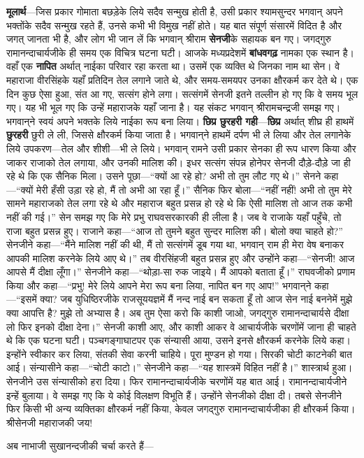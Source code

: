\begin{sloppypar}\justifying{}
\textbf{मूलार्थ}—जिस प्रकार गोमाता बछड़ेके लिये सदैव सन्मुख होती है, उसी प्रकार श्याम\-सुन्दर भगवान् अपने भक्तोंके सदैव सन्मुख रहते हैं, उनसे कभी भी विमुख नहीं होते। यह बात संपूर्ण संसारमें विदित है और जगत् जानता भी है, और लोग भी जान लें कि भगवान् श्रीराम \textbf{सेनजी}के सहायक बन गए। जगद्गुरु रामानन्दाचार्यजीके ही समय एक विचित्र घटना घटी। आजके मध्यप्रदेशमें \textbf{बांधवगढ़} नामका एक स्थान है। वहाँ एक \textbf{नापित} अर्थात् नाईका परिवार रहा करता था। उसमें एक व्यक्ति थे जिनका नाम था सेन। वे महाराजा वीरसिंहके यहाँ प्रतिदिन तेल लगाने जाते थे, और समय-समयपर उनका क्षौरकर्म कर देते थे। एक दिन कुछ ऐसा हुआ, संत आ गए, सत्संग होने लगा। सत्संगमें सेनजी इतने तल्लीन हो गए कि वे समय भूल गए। यह भी भूल गए कि उन्हें महाराजके यहाँ जाना है। यह संकट भगवान् श्रीरामचन्द्रजी समझ गए। भगवान्‌ने स्वयं अपने भक्तके लिये नाईका रूप बना लिया। \textbf{छिप्र छुरहरी गही}—\textbf{छिप्र} अर्थात् शीघ्र ही हाथमें \textbf{छुरहरी} छुरी ले ली, जिससे क्षौरकर्म किया जाता है। भगवान्‌ने हाथमें दर्पण भी ले लिया और तेल लगानेके लिये उपकरण—तेल और शीशी—भी ले लिये। भगवान् रामने उसी प्रकार सेनका ही रूप धारण किया और जाकर राजाको तेल लगाया, और उनकी मालिश की। इधर सत्संग संपन्न होनेपर सेनजी दौड़े-दौड़े जा ही रहे थे कि एक सैनिक मिला। उसने पूछा—“क्यों आ रहे हो? अभी तो तुम लौट गए थे।” सेनने कहा—“क्यों मेरी हँसी उड़ा रहे हो, मैं तो अभी आ रहा हूँ।” सैनिक फिर बोला—“नहीं नहीं! अभी तो तुम मेरे सामने महाराजको तेल लगा रहे थे और महाराज बहुत प्रसन्न हो रहे थे कि ऐसी मालिश तो आज तक कभी नहीं की गई।” सेन समझ गए कि मेरे प्रभु राघव\-सरकारकी ही लीला है। जब वे राजाके यहाँ पहुँचे, तो राजा बहुत प्रसन्न हुए। राजाने कहा—“आज तो तुमने बहुत सुन्दर मालिश की। बोलो क्या चाहते हो?” सेनजीने कहा—“मैंने मालिश नहीं की थी, मैं तो सत्संगमें डूब गया था, भगवान् राम ही मेरा वेष बनाकर आपकी मालिश करनेके लिये आए थे।” तब वीरसिंहजी बहुत प्रसन्न हुए और उन्होंने कहा—“सेनजी! आज आपसे मैं दीक्षा लूँगा।” सेनजीने कहा—“थोड़ा-सा रुक जाइये। मैं आपको बताता हूँ।” राघवजीको प्रणाम किया और कहा—“प्रभु! मेरे लिये आपने मेरा रूप बना लिया, नापित बन गए आप!” भगवान्‌ने कहा—“इसमें क्या? जब युधिष्ठिरजीके राजसूययज्ञमें मैं नन्द नाई बन सकता हूँ तो आज सेन नाई बननेमें मुझे क्या आपत्ति है? मुझे तो अभ्यास है। अब तुम ऐसा करो कि काशी जाओ, जगद्गुरु रामानन्दाचार्यसे दीक्षा लो फिर इनको दीक्षा देना।” सेनजी काशी आए, और काशी आकर वे आचार्यजीके चरणोंमें जाना ही चाहते थे कि एक घटना घटी। पञ्चगङ्गा\-घाटपर एक संन्यासी आया, उसने इनसे क्षौरकर्म करनेके लिये कहा। इन्होंने स्वीकार कर लिया, संतकी सेवा करनी चाहिये। पूरा मुण्डन हो गया। सिरकी चोटी काटनेकी बात आई। संन्यासीने कहा—“चोटी काटो।” सेनजीने कहा—“यह शास्त्रमें विहित नहीं है।” शास्त्रार्थ हुआ। सेनजीने उस संन्यासीको हरा दिया। फिर रामानन्दाचार्यजीके चरणोंमें यह बात आई। रामानन्दाचार्यजीने इन्हें बुलाया। वे समझ गए कि ये कोई विलक्षण विभूति हैं। उन्होंने सेनजीको दीक्षा दी। तबसे सेनजीने फिर किसी भी अन्य व्यक्तिका क्षौरकर्म नहीं किया, केवल जगद्गुरु रामानन्दाचार्यजीका ही क्षौरकर्म किया। श्रीसेनजी महाराजकी जय!
\end{sloppypar}
\begin{sloppypar}\justifying{}
अब नाभाजी सुखानन्दजीकी चर्चा करते हैं—
\end{sloppypar}


